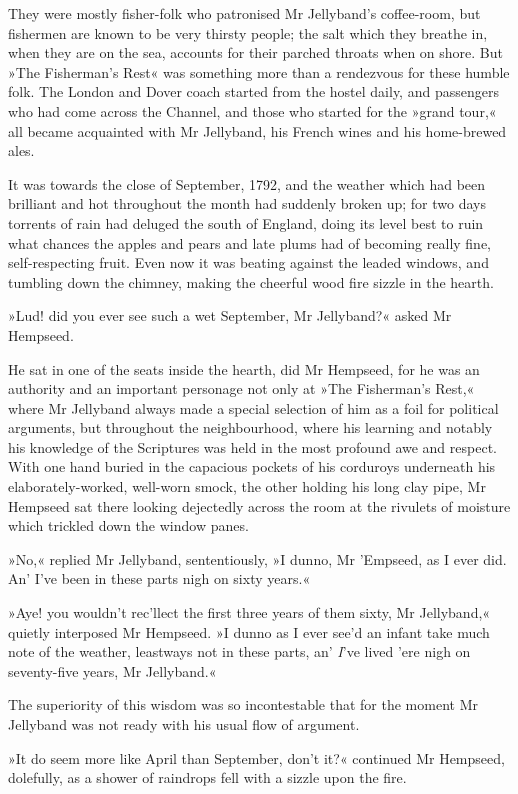 They were mostly fisher-folk who patronised Mr Jellyband's coffee-room, but fishermen are known to be very thirsty people; the salt which they breathe in, when they are on the sea, accounts for their parched throats when on shore. But »The Fisherman's Rest« was something more than a rendezvous for these humble folk. The London and Dover coach started from the hostel daily, and passengers who had come across the Channel, and those who started for the »grand tour,« all became acquainted with Mr Jellyband, his French wines and his home-brewed ales.

It was towards the close of September, 1792, and the weather which had been brilliant and hot throughout the month had suddenly broken up; for two days torrents of rain had deluged the south of England, doing its level best to ruin what chances the apples and pears and late plums had of becoming really fine, self-respecting fruit. Even now it was beating against the leaded windows, and tumbling down the chimney, making the cheerful wood fire sizzle in the hearth.

»Lud! did you ever see such a wet September, Mr Jellyband?« asked Mr Hempseed.

He sat in one of the seats inside the hearth, did Mr Hempseed, for he was an authority and an important personage not only at »The Fisherman's Rest,« where Mr Jellyband always made a special selection of him as a foil for political arguments, but throughout the neighbourhood, where his learning and notably his knowledge of the Scriptures was held in the most profound awe and respect. With one hand buried in the capacious pockets of his corduroys underneath his elaborately-worked, well-worn smock, the other holding his long clay pipe, Mr Hempseed sat there looking dejectedly across the room at the rivulets of moisture which trickled down the window panes.

»No,« replied Mr Jellyband, sententiously, »I dunno, Mr 'Empseed, as I ever did. An' I've been in these parts nigh on sixty years.«

»Aye! you wouldn't rec'llect the first three years of them sixty, Mr Jellyband,« quietly interposed Mr Hempseed. »I dunno as I ever see'd an infant take much note of the weather, leastways not in these parts, an' \textit{I}'ve lived 'ere nigh on seventy-five years, Mr Jellyband.«

The superiority of this wisdom was so incontestable that for the moment Mr Jellyband was not ready with his usual flow of argument.

»It do seem more like April than September, don't it?« continued Mr Hempseed, dolefully, as a shower of raindrops fell with a sizzle upon the fire.


